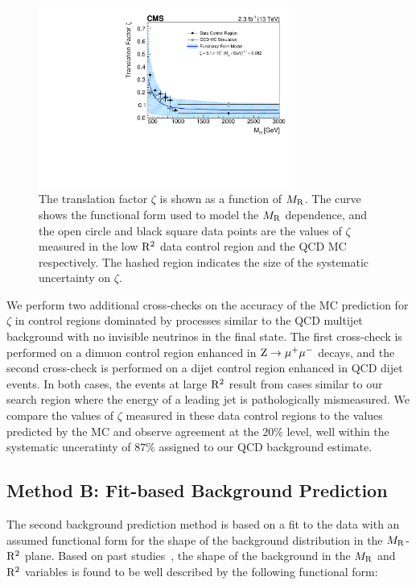\begin{figure}[!htb]
\begin{center}
\includegraphics[width=0.75\textwidth]{figs/analysis13TeV/npf_vs_mr_razor_fit.pdf}
\caption{\label{fig:QCDTranslationFactor} 
The translation factor $\zeta$ is shown as a function of $M_\mathrm{R}$. The curve shows the 
functional form used to model the $M_\mathrm{R}$ dependence, and the open circle and black square data
points are the values of $\zeta$ measured in the low $\mathrm{R}^2$ data control region and the QCD MC
respectively. The hashed region indicates the size of the systematic uncertainty on
$\zeta$.
}
\end{center}
\end{figure}

We perform two additional cross-checks on the accuracy of the MC prediction for
$\zeta$ in control regions dominated by processes similar to the QCD multijet
background with no invisible neutrinos in the final state. The first 
cross-check is performed on a dimuon control region enhanced in $\mathrm{Z}\rightarrow{\mu}^+{\mu}^-$ decays, 
and the second cross-check is performed on a dijet control region enhanced in QCD dijet events. 
In both cases, the events at large $\mathrm{R}^2$ result from cases similar to our search region
where the energy of a leading jet is pathologically mismeasured. We compare the values of
$\zeta$ measured in these data control regions to the values predicted by the MC
and observe agreement at the $20\%$ level, well within the 
systematic unceratinty of $87\%$ assigned to our QCD background estimate. 


\subsection{Method B: Fit-based Background Prediction}
\label{sec:FitBkg}

The second background prediction method is based on a fit to the data with an 
assumed functional form for the shape of the background distribution in the $M_\mathrm{R}$-$\mathrm{R}^2$ plane. 
Based on past studies~\cite{razorPRD,razor8TeV}, the shape of the background in
the $M_\mathrm{R}$ and $\mathrm{R}^2$ variables is found to be well described by the following functional form:

